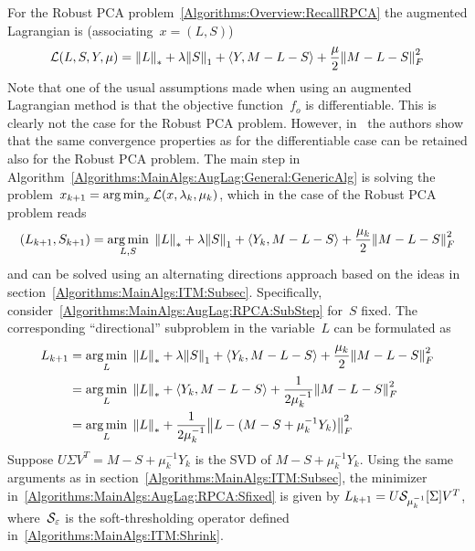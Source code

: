 For the Robust PCA problem~\eqref{Algorithms:Overview:RecallRPCA} the augmented Lagrangian is (associating~$x = (L,S)$)
%
\begin{align}
{\mathcal{L}}(L,S,Y,\mu) = {\left\|L\right\|}_{*}^{} + \lambda {\left\|S\right\|}_{1}^{} + \langle Y, M-L-S \rangle + \frac{\mu}{2} {\left\|M-L-S\right\|}_{F}^{2}
\label{Algorithms:MainAlgs:AugLag:RPCA:AugLagr}
\end{align}
%
Note that one of the usual assumptions made when using an augmented Lagrangian method is that the objective function~$f_o$ is differentiable. This is clearly not the case for the Robust PCA problem. However, in~\cite{Lin:2010fk} the authors show that the same convergence properties as for the differentiable case can be retained also for the Robust PCA problem. The main step in Algorithm~\ref{Algorithms:MainAlgs:AugLag:General:GenericAlg} is solving the problem~$x_{k+1} = \operatorname*{arg\,min}_x {\mathcal{L}}(x,\lambda_k,\mu_k)$, which in the case of the Robust PCA problem reads
%
\begin{align}
(L_{k+1},S_{k+1}) = \operatorname*{arg\,min}_{L,S} \; {\left\|L\right\|}_{*}^{} + \lambda {\left\|S\right\|}_{1}^{} + \langle Y_k, M-L-S \rangle + \frac{\mu_k}{2} {\left\|M-L-S\right\|}_{F}^{2}
\label{Algorithms:MainAlgs:AugLag:RPCA:SubStep}
\end{align}
%
and can be solved using an alternating directions approach based on the ideas in section~\ref{Algorithms:MainAlgs:ITM:Subsec}. Specifically, consider~\eqref{Algorithms:MainAlgs:AugLag:RPCA:SubStep} for~$S$ fixed. The corresponding ``directional'' subproblem in the variable~$L$ can be formulated as
%
\begin{align}
\begin{split}
L_{k+1} &= \operatorname*{arg\,min}_{L} \; {\left\|L\right\|}_{*}^{} + \lambda {\left\|S\right\|}_{1}^{} + \langle Y_k, M-L-S \rangle + \frac{\mu_k}{2} {\left\|M-L-S\right\|}_{F}^{2} \\
&= \operatorname*{arg\,min}_{L} \; {\left\|L\right\|}_{*}^{} + \langle Y_k, M-L-S \rangle + \frac{1}{2\mu_k^{-1}} {\left\|M-L-S\right\|}_{F}^{2} \\
&= \operatorname*{arg\,min}_{L} \; {\left\|L\right\|}_{*}^{} + \frac{1}{2\mu_k^{-1}} {\left\|L-(M-S+\mu_k^{-1}Y_k)\right\|}_{F}^{2} 
\end{split}
\label{Algorithms:MainAlgs:AugLag:RPCA:Sfixed}
\end{align}
%
Suppose $U\Sigma V^T = M-S+\mu_k^{-1}Y_k$ is the SVD of $M-S+\mu_k^{-1}Y_k$. Using the same arguments as in section~\ref{Algorithms:MainAlgs:ITM:Subsec}, the minimizer in~\eqref{Algorithms:MainAlgs:AugLag:RPCA:Sfixed} is given by $L_{k+1} = U {\mathcal{S}}_{\mu_k^{-1}}[\Sigma] V^T$, where~${\mathcal{S}}_\varepsilon$ is the soft-thresholding operator defined in~\eqref{Algorithms:MainAlgs:ITM:Shrink}. 

